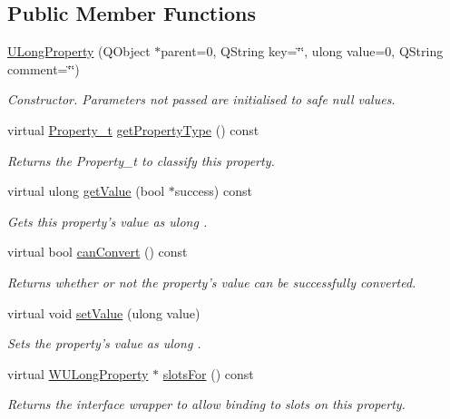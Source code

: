 \subsection*{Public Member Functions}
\begin{DoxyCompactItemize}
\item 
\hyperlink{class_u_long_property_ac844158e013ca84c63b7bb434aa4ed4b}{U\-Long\-Property} (Q\-Object $\ast$parent=0, Q\-String key=\char`\"{}\char`\"{}, ulong value=0, Q\-String comment=\char`\"{}\char`\"{})
\begin{DoxyCompactList}\small\item\em Constructor. Parameters not passed are initialised to safe null values. \end{DoxyCompactList}\item 
virtual \hyperlink{group___property_classes_ga38f1ccddda12c7cb50b868c9f789ee37}{Property\-\_\-t} \hyperlink{class_u_long_property_aab8927e988f483d6334ba1ccffeeda99}{get\-Property\-Type} () const 
\begin{DoxyCompactList}\small\item\em Returns the Property\-\_\-t to classify this property. \end{DoxyCompactList}\item 
virtual ulong \hyperlink{class_u_long_property_a2d0ab1518fe88b2201b98dd5adf7f0a2}{get\-Value} (bool $\ast$success) const 
\begin{DoxyCompactList}\small\item\em Gets this property's value as ulong . \end{DoxyCompactList}\item 
virtual bool \hyperlink{class_u_long_property_a1ceb817d2b4fad531e3a893ad1b33273}{can\-Convert} () const 
\begin{DoxyCompactList}\small\item\em Returns whether or not the property's value can be successfully converted. \end{DoxyCompactList}\item 
virtual void \hyperlink{class_u_long_property_ac52a81a11a65723ab008ba066be522f3}{set\-Value} (ulong value)
\begin{DoxyCompactList}\small\item\em Sets the property's value as ulong . \end{DoxyCompactList}\item 
virtual \hyperlink{class_w_u_long_property}{W\-U\-Long\-Property} $\ast$ \hyperlink{class_u_long_property_a9c7a625deeba3f906ae2cb415a9eddfb}{slots\-For} () const 
\begin{DoxyCompactList}\small\item\em Returns the interface wrapper to allow binding to slots on this property. \end{DoxyCompactList}\end{DoxyCompactItemize}
